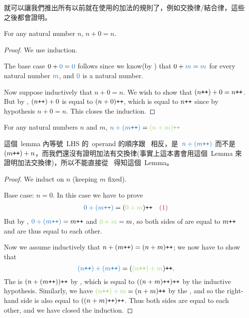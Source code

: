 \begin{note}
 就可以讓我們推出所有以前就在使用的加法的規則了，例如交換律/結合律，這些之後都會證明。
\end{note}

\begin{lemma}\label{lem 2.2.2}
For any natural number \(n\), \(n + 0 = n\).
\end{lemma}
\begin{proof} We use induction.

The base case \(0 + \BLUE{0} = \BLUE{0}\) follows since we know(by ) that \(0 + \BLUE{m} = \BLUE{m}\) for every natural number \(\BLUE{m}\), and \(\BLUE{0}\) is a natural number.

Now suppose inductively that \(n + 0 = n\). We wish to show that \((n\texttt{++})+0 = n\texttt{++}\). But by , \((n\texttt{++}) + 0\) is equal to \((n + 0)\texttt{++}\), which is equal to \(n\texttt{++}\) since by hypothesis \(n + 0 = n\). This closes the induction.
\end{proof}

\begin{lemma}\label{lem 2.2.3} For any natural numbers \(n\) and \(m\), \(\BLUE{n + (m\INC)} = \GREEN{(n + m)\INC}\)
\end{lemma}
\begin{note}
這個\ lemma 內等號\ LHS 的\ operand 的順序跟\  相反，是\ \(\BLUE{n + (m\INC)}\) 而不是\ \((m\texttt{++}) + n\)，而我們還沒有證明加法有交換律(事實上這本書會用這個\ Lemma 來證明加法交換律)，所以不能直接從\  得知這個\ Lemma。
\end{note}
\begin{proof}
We induct on \(n\) (keeping \(m\) fixed).

Base case: \(n = 0\). In this case we have to prove
\begin{align*}
    & \BLUE{0 + (m\INC)} = (\GREEN{0 + m})\INC & \text{\MAROON{(1)}}
\end{align*}
But by , \(\BLUE{0 + (m\INC)} = m\INC\) and \(\GREEN{0 + m} = m\), so both sides of  are equal to \(m\texttt{++}\) and are thus equal to each other.

Now we assume inductively that \(n + (m\texttt{++}) = (n + m)\texttt{++}\); we now have to show that 
\[\BLUE{(n\INC) + (m\INC)} = (\GREEN{(n\INC) + m})\INC.\]
The  is \((n + (m\texttt{++}))\texttt{++}\) by , which is equal to \(((n + m)\texttt{++})\texttt{++}\) by the inductive hypothesis. Similarly, we have \(\GREEN{(n\INC) + m} =(n + m)\INC\) by the , and so the right-hand side is also equal to \(((n + m)\texttt{++})\texttt{++}\). Thus both sides are equal to each other, and we have closed the induction.
\end{proof}

